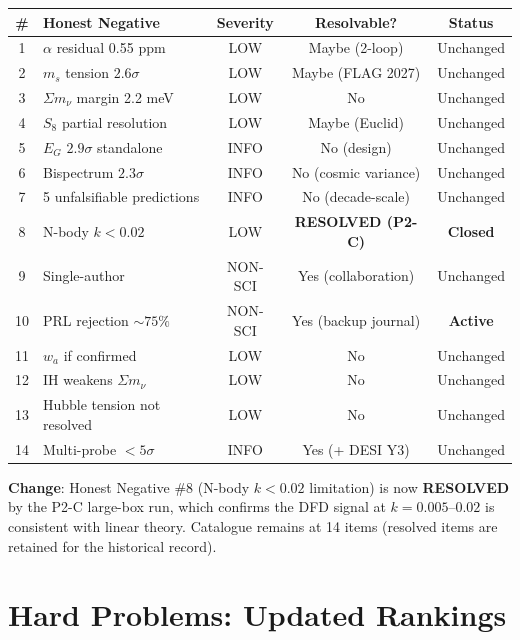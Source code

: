 \documentclass[11pt,a4paper]{article}
\begin{document}
\begin{center}
\begin{tabular}{clccc}
\toprule
\textbf{\#} & \textbf{Honest Negative} & \textbf{Severity} & \textbf{Resolvable?} & \textbf{Status} \\
\midrule
1 & $\alpha$ residual 0.55 ppm & LOW & Maybe (2-loop) & Unchanged \\
2 & $m_s$ tension $2.6\sigma$ & LOW & Maybe (FLAG 2027) & Unchanged \\
3 & $\Sigma m_\nu$ margin 2.2 meV & LOW & No & Unchanged \\
4 & $S_8$ partial resolution & LOW & Maybe (Euclid) & Unchanged \\
5 & $E_G$ $2.9\sigma$ standalone & INFO & No (design) & Unchanged \\
6 & Bispectrum $2.3\sigma$ & INFO & No (cosmic variance) & Unchanged \\
7 & 5 unfalsifiable predictions & INFO & No (decade-scale) & Unchanged \\
8 & N-body $k < 0.02$ & LOW & \textbf{RESOLVED (P2-C)} & \textbf{Closed} \\
9 & Single-author & NON-SCI & Yes (collaboration) & Unchanged \\
10 & PRL rejection $\sim 75\%$ & NON-SCI & Yes (backup journal) & \textbf{Active} \\
11 & $w_a$ if confirmed & LOW & No & Unchanged \\
12 & IH weakens $\Sigma m_\nu$ & LOW & No & Unchanged \\
13 & Hubble tension not resolved & LOW & No & Unchanged \\
14 & Multi-probe $< 5\sigma$ & INFO & Yes (+ DESI Y3) & Unchanged \\
\bottomrule
\end{tabular}
\end{center}

\textbf{Change}: Honest Negative \#8 (N-body $k < 0.02$ limitation) is now \textbf{RESOLVED} by the P2-C large-box run, which confirms the DFD signal at $k = 0.005$--$0.02$ is consistent with linear theory. Catalogue remains at 14 items (resolved items are retained for the historical record).

\section{Hard Problems: Updated Rankings}
\end{document}
